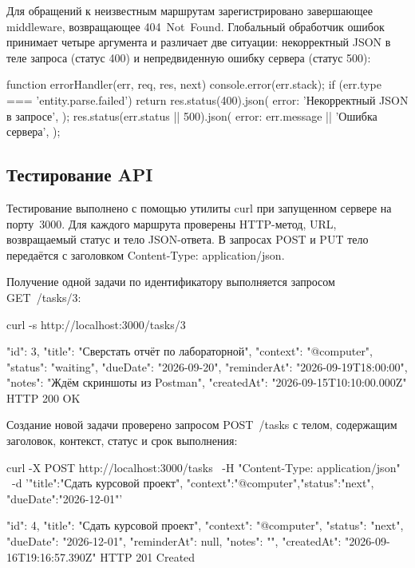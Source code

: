 \documentclass{stp}
\begin{document}
Для обращений к неизвестным маршрутам зарегистрировано завершающее
middleware, возвращающее 404~Not~Found. Глобальный обработчик ошибок
принимает четыре аргумента и различает две ситуации: некорректный
JSON в теле запроса (статус 400) и непредвиденную ошибку сервера
(статус 500):

\begin{stplisting}
function errorHandler(err, req, res, next) {
  console.error(err.stack);
  if (err.type === 'entity.parse.failed') {
    return res.status(400).json({
      error: 'Некорректный JSON в запросе',
    });
  }
  res.status(err.status || 500).json({
    error: err.message || 'Ошибка сервера',
  });
}
\end{stplisting}

\subsection{Тестирование API}

Тестирование выполнено с помощью утилиты curl при запущенном сервере
на порту~3000. Для каждого маршрута проверены HTTP-метод, URL,
возвращаемый статус и тело JSON-ответа. В запросах POST и PUT тело
передаётся с заголовком Content-Type: application/json.

Получение одной задачи по идентификатору выполняется запросом
GET~/tasks/3:

\begin{stplisting}
curl -s http://localhost:3000/tasks/3

{
  "id": 3,
  "title": "Сверстать отчёт по лабораторной",
  "context": "@computer",
  "status": "waiting",
  "dueDate": "2026-09-20",
  "reminderAt": "2026-09-19T18:00:00",
  "notes": "Ждём скриншоты из Postman",
  "createdAt": "2026-09-15T10:10:00.000Z"
}
                                 HTTP 200 OK
\end{stplisting}

Создание новой задачи проверено запросом POST~/tasks с
телом, содержащим заголовок, контекст, статус и срок выполнения:

\begin{stplisting}
curl -X POST http://localhost:3000/tasks \
  -H "Content-Type: application/json" \
  -d '{"title":"Сдать курсовой проект",
       "context":"@computer","status":"next",
       "dueDate":"2026-12-01"}'

{
  "id": 4,
  "title": "Сдать курсовой проект",
  "context": "@computer",
  "status": "next",
  "dueDate": "2026-12-01",
  "reminderAt": null,
  "notes": "",
  "createdAt": "2026-09-16T19:16:57.390Z"
}
                            HTTP 201 Created
\end{stplisting}
\end{document}
